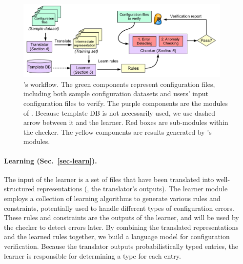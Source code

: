 \begin{figure}[tbp] \centering
\includegraphics[width=0.95\textwidth]{figs/overview}
\caption{\app's workflow. The green components represent configuration 
  files, including both sample configuration datasets and users' input
  configuration files to verify. 
  The purple components are the modules of \app.
  Because template DB is not necessarily used, we use dashed
  arrow between it and the learner.
  Red boxes are sub-modules within the checker.
  The yellow components are results generated by \app's modules.}
\label{fig-overview}
\end{figure}

\paragraph{Learning (Sec.~\ref{sec-learn}).}
The input of the learner is a set of files that have been translated
into well-structured representations (\ie, the translator's
outputs). The learner module employs a collection of learning algorithms
to generate various rules and constraints,
potentially used to handle different types of configuration errors.
These rules and constraints are the outputs of the learner, 
and will be used by the checker to detect errors later.
By combining the translated representations and the learned
rules together, we build a language model for
configuration verification.
Because the translator outputs probabilistically typed entries,
the learner is responsible for determining a type for each entry.


